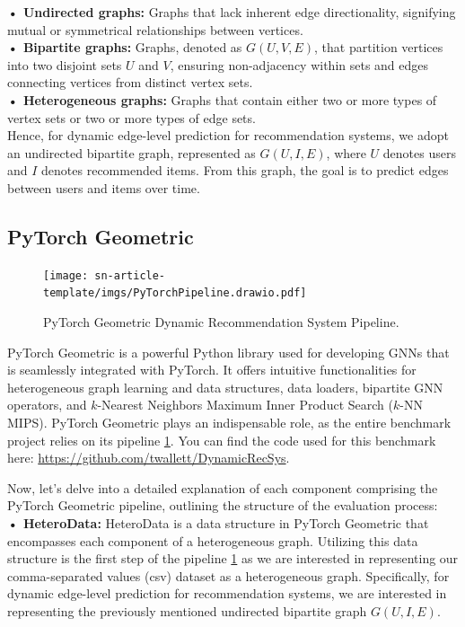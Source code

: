\documentclass{scrartcl}
\begin{document}
\textbf{• Undirected graphs:} Graphs that lack inherent edge directionality, signifying mutual or symmetrical relationships between vertices. \\ 

\textbf{• Bipartite graphs:} Graphs, denoted as $G(U, V, E)$, that partition vertices into two disjoint sets $U$ and $V$, ensuring non-adjacency within sets and edges connecting vertices from distinct vertex sets. \\

\textbf{• Heterogeneous graphs:} Graphs that contain either two or more types of vertex sets or two or more types of edge sets. \\ 

Hence, for dynamic edge-level prediction for recommendation systems, we adopt an undirected bipartite graph, represented as $G(U, I, E)$, where $U$ denotes users and $I$ denotes recommended items. From this graph, the goal is to predict edges between users and items over time.

\subsection{PyTorch Geometric}

\begin{figure}
    \centering
    \texttt{[image: sn-article-template/imgs/PyTorchPipeline.drawio.pdf]}
    \caption{PyTorch Geometric Dynamic Recommendation System Pipeline.}
    \label{fig:pytorch_geometric_pipeline}
\end{figure}

\quad PyTorch Geometric is a powerful Python library used for developing GNNs that is seamlessly integrated with PyTorch. It offers intuitive functionalities for heterogeneous graph learning and data structures, data loaders, bipartite GNN operators, and $k$-Nearest Neighbors Maximum Inner Product Search ($k$-NN MIPS). PyTorch Geometric plays an indispensable role, as the entire benchmark project relies on its pipeline \ref{fig:pytorch_geometric_pipeline}. You can find the code used for this benchmark here: \href{https://github.com/twallett/DynamicRecSys}{https://github.com/twallett/DynamicRecSys}. 

Now, let's delve into a detailed explanation of each component comprising the PyTorch Geometric pipeline, outlining the structure of the evaluation process: \\

\textbf{• HeteroData:} HeteroData is a data structure in PyTorch Geometric that encompasses each component of a heterogeneous graph. Utilizing this data structure is the first step of the pipeline \ref{fig:pytorch_geometric_pipeline} as we are interested in representing our comma-separated values (csv) dataset as a heterogeneous graph. Specifically, for dynamic edge-level prediction for recommendation systems, we are interested in representing the previously mentioned undirected bipartite graph $G(U,I,E)$. 
\end{document}
